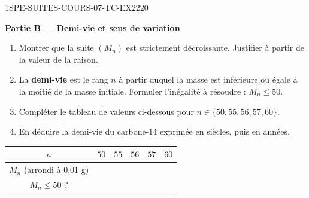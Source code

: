 \begin{exercice}{1SPE-SUITES-COURS-07-TC-EX2}{2}{20}

\textbf{Partie B — Demi-vie et sens de variation}

\begin{enumerate}
  \item Montrer que la suite $(M_n)$ est strictement décroissante. Justifier à partir de la valeur de la raison.
  \item La \textbf{demi-vie} est le rang $n$ à partir duquel la masse est inférieure ou égale à la moitié de la masse initiale. Formuler l'inégalité à résoudre : $M_n \leq 50$.
  \item Compléter le tableau de valeurs ci-dessous pour $n \in \{50, 55, 56, 57, 60\}$.
  \item En déduire la demi-vie du carbone-14 exprimée en siècles, puis en années.
\end{enumerate}

\begin{center}
\begin{tabular}{|c|c|c|c|c|c|}
\hline
$n$ & $50$ & $55$ & $56$ & $57$ & $60$ \\
\hline
$M_n$ (arrondi à 0,01 g) & \phantom{xxx} & \phantom{xxx} & \phantom{xxx} & \phantom{xxx} & \phantom{xxx} \\
\hline
$M_n \leq 50$ ? & \phantom{oui/non} & \phantom{oui/non} & \phantom{oui/non} & \phantom{oui/non} & \phantom{oui/non} \\
\hline
\end{tabular}
\end{center}

\end{exercice}

